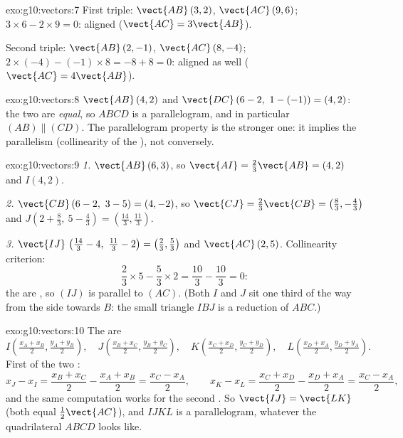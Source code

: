 \begin{solution}{exo:g10:vectors:7}
First triple: $\vect{AB}\,(3, 2)$, $\vect{AC}\,(9, 6)$;
$3 \times 6 - 2 \times 9 = 0$: aligned ($\vect{AC} = 3\vect{AB}$).

Second triple: $\vect{AB}\,(2, -1)$, $\vect{AC}\,(8, -4)$;
$2 \times (-4) - (-1) \times 8 = -8 + 8 = 0$: aligned as well
($\vect{AC} = 4\vect{AB}$).
\end{solution}

\begin{solution}{exo:g10:vectors:8}
$\vect{AB}\,(4, 2)$ and $\vect{DC}\,(6-2,\ 1-(-1)) = (4, 2)$: the two
 are \emph{equal}, so $ABCD$ is a parallelogram, and in particular
$(AB) \parallel (CD)$. The parallelogram property is the stronger one: it
implies the parallelism (collinearity of the ), not conversely.
\end{solution}

\begin{solution}{exo:g10:vectors:9}
\emph{1.} $\vect{AB}\,(6, 3)$, so
$\vect{AI} = \frac23\vect{AB} = (4, 2)$ and $I(4, 2)$.

\emph{2.} $\vect{CB}\,(6-2,\ 3-5) = (4, -2)$, so
$\vect{CJ} = \frac23\vect{CB} = \left(\frac83, -\frac43\right)$ and
$J\left(2 + \frac83,\ 5 - \frac43\right) = \left(\frac{14}{3},
\frac{11}{3}\right)$.

\emph{3.} $\vect{IJ}\,\left(\frac{14}{3} - 4,\ \frac{11}{3} - 2\right) =
\left(\frac23, \frac53\right)$ and $\vect{AC}\,(2, 5)$. Collinearity
criterion:
\[
\frac23 \times 5 - \frac53 \times 2 = \frac{10}{3} - \frac{10}{3} = 0 :
\]
the  are , so $(IJ)$ is parallel to $(AC)$. (Both $I$ and
$J$ sit one third of the way from the side towards $B$: the small
triangle $IBJ$ is a reduction of $ABC$.)
\end{solution}

\begin{solution}{exo:g10:vectors:10}
The  are
\[
I\left(\tfrac{x_A + x_B}{2}, \tfrac{y_A + y_B}{2}\right), \quad
J\left(\tfrac{x_B + x_C}{2}, \tfrac{y_B + y_C}{2}\right), \quad
K\left(\tfrac{x_C + x_D}{2}, \tfrac{y_C + y_D}{2}\right), \quad
L\left(\tfrac{x_D + x_A}{2}, \tfrac{y_D + y_A}{2}\right).
\]
First  of the two :
\[
x_J - x_I = \frac{x_B + x_C}{2} - \frac{x_A + x_B}{2}
= \frac{x_C - x_A}{2},
\qquad
x_K - x_L = \frac{x_C + x_D}{2} - \frac{x_D + x_A}{2}
= \frac{x_C - x_A}{2},
\]
and the same computation works for the second . So
$\vect{IJ} = \vect{LK}$ (both equal $\frac12\vect{AC}$), and $IJKL$ is a
parallelogram, whatever the quadrilateral $ABCD$ looks like.
\end{solution}

